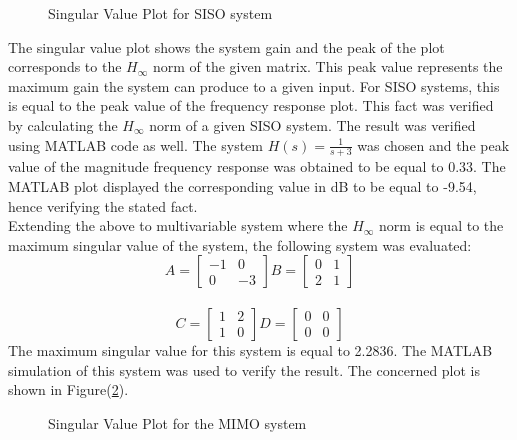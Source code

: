 \documentclass[a4paper,12pt]{article}
\begin{document}
				\begin{figure}[H]
 
			  \centering
			  
			  
			  \caption{Singular Value Plot for SISO system}
			 \label{singular1}
		\end{figure}	
		The singular value plot shows the system gain and the peak of the plot corresponds to the $H_{\infty}$ norm of the given matrix. This peak value represents the maximum gain the system can produce to a given input. For SISO systems, this is equal to the peak value of the frequency response plot. This fact was verified by calculating the $H_{\infty}$ norm of a given SISO system. The result was verified using MATLAB code as well. The system $H(s)=\frac{1}{s+3}$ was chosen and the peak value of the magnitude frequency response was obtained to be equal to 0.33. The MATLAB plot displayed the corresponding value in dB to be equal to -9.54, hence verifying the stated fact. \\
		Extending the above to multivariable system where the $H_{\infty}$ norm is equal to the maximum singular value of the system, the following system was evaluated:
		\[A=
		\begin{bmatrix}
		-1 & 0 \\ 0 & -3
		\end{bmatrix}
		B=
		\begin{bmatrix}
		0 & 1 \\ 2 & 1
		\end{bmatrix}
		\]
		\\
		\[C=
		\begin{bmatrix}
		1 & 2 \\ 1 & 0
		\end{bmatrix}
		D=\begin{bmatrix}
		0 & 0\\ 0 & 0		\end{bmatrix}
		\]
		The maximum singular value for this system is equal to 2.2836. The MATLAB simulation of this system was used to verify the result. The concerned plot is shown in Figure(\ref{singular2}).
		
				\begin{figure}[H]
 
			  \centering
			  
			  
			  \caption{Singular Value Plot for the MIMO system}
			 \label{singular2}
		\end{figure}			
	
\end{document}
